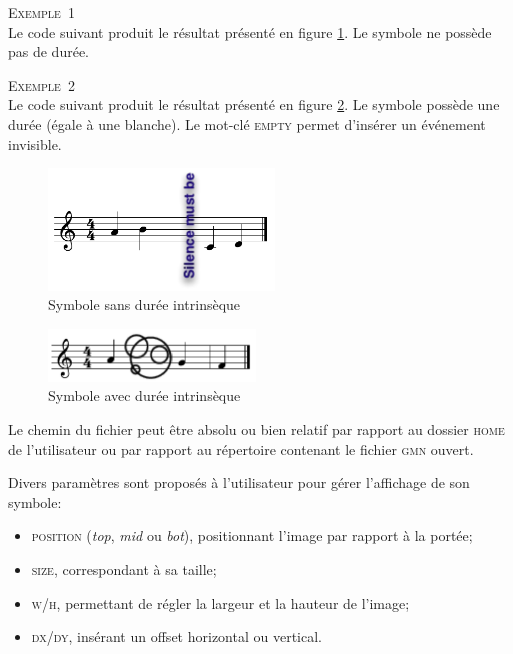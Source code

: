\documentclass{article}
\newenvironment{gmncode}	{\vspace{-2mm}\small\verbatim}{\endverbatim\vspace{-2mm}}
\newcommand{\exemple}		{\vspace{2mm}\hspace*{-6mm}\textsc{Exemple}}
\begin{document}
\exemple~1\\
Le code suivant produit le résultat présenté en figure \ref{fig:symbol1}. Le symbole ne possède pas de durée.
\begin{gmncode}
[
  \meter<"4/4">
  a b
  \symbol<file="symbols/silence.png"> 
  c d
]
\end{gmncode}

\exemple~2\\
Le code suivant produit le résultat présenté en figure \ref{fig:symbol2}. Le symbole possède une durée (égale à une blanche). Le mot-clé \textsc{empty} permet d'insérer un événement invisible.
\begin{gmncode}
[
  \meter<"4/4">
  a
  \symbol<file="symbols/ronds.png", dx=-5> (empty/2)
  g/4 f
]
\end{gmncode}

\begin{figure}[h]
\centering
\includegraphics[width=60mm]{img/partitions/symbol1.pdf}
\caption{Symbole sans durée intrinsèque}
\label{fig:symbol1}
\end{figure}

\begin{figure}[h]
\centering
\includegraphics[width=55mm]{img/partitions/symbol2.pdf}
\caption{Symbole avec durée intrinsèque}
\label{fig:symbol2}
\end{figure}

Le chemin du fichier peut être absolu ou bien relatif par rapport au dossier \textsc{home} de l'utilisateur ou par rapport au répertoire contenant le fichier \textsc{gmn} ouvert.

Divers paramètres sont proposés à l'utilisateur pour gérer l'affichage de son symbole:
\begin{itemize}
	\item \textsc{position} (\emph{top}, \emph{mid} ou \emph{bot}), positionnant l'image par rapport à la portée;
	\item \textsc{size}, correspondant à sa taille;
	\item \textsc{w/h}, permettant de régler la largeur et la hauteur de l'image;
	\item \textsc{dx/dy}, insérant un offset horizontal ou vertical.
\end{itemize}
\end{document}
